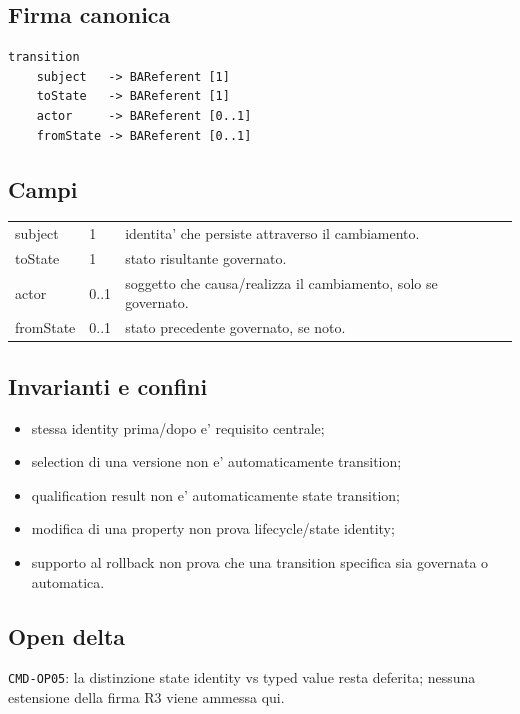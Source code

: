 \documentclass[11pt,a4paper]{article}
\begin{document}
\subsection{Firma canonica}
\begin{lstlisting}
transition
    subject   -> BAReferent [1]
    toState   -> BAReferent [1]
    actor     -> BAReferent [0..1]
    fromState -> BAReferent [0..1]
\end{lstlisting}

\subsection{Campi}
\begin{tabularx}{\textwidth}{L{36mm}L{24mm}Y}
\toprule
subject & 1 & identita' che persiste attraverso il cambiamento. \\
toState & 1 & stato risultante governato. \\
actor & 0..1 & soggetto che causa/realizza il cambiamento, solo se governato. \\
fromState & 0..1 & stato precedente governato, se noto. \\
\bottomrule
\end{tabularx}

\subsection{Invarianti e confini}
\begin{itemize}
  \item stessa identity prima/dopo e' requisito centrale;
  \item selection di una versione non e' automaticamente transition;
  \item qualification result non e' automaticamente state transition;
  \item modifica di una property non prova lifecycle/state identity;
  \item supporto al rollback non prova che una transition specifica sia governata o automatica.
\end{itemize}

\subsection{Open delta}
\opentag\quad \texttt{CMD-OP05}: la distinzione state identity vs typed value resta deferita; nessuna estensione della firma R3 viene ammessa qui.
\end{document}
